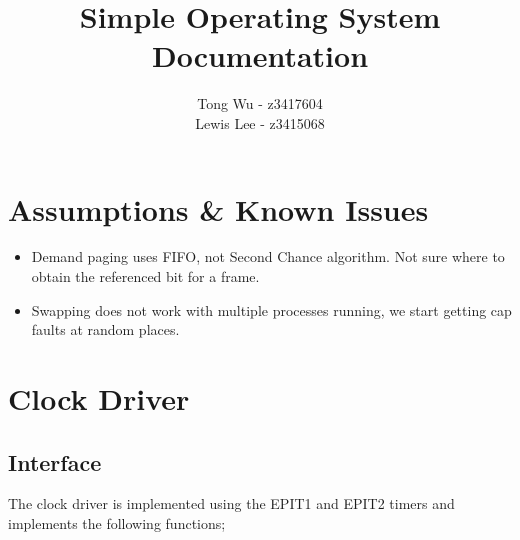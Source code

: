 \documentclass[12pt]{article}
\begin{document}
\pagestyle{myheadings}

\title{Simple Operating System\\Documentation}
\author{Tong Wu - z3417604\\Lewis Lee - z3415068}

\maketitle

\clearpage

\tableofcontents

\clearpage

\section{Assumptions \& Known Issues}
\begin{itemize}
\item Demand paging uses FIFO, not Second Chance algorithm. Not sure where to obtain the referenced bit for a frame.
\item Swapping does not work with multiple processes running, we start getting cap faults at random places.
\end{itemize}

\section{Clock Driver}
\subsection{Interface}
The clock driver is implemented using the EPIT1 and EPIT2 timers and implements the following functions;
\end{document}
